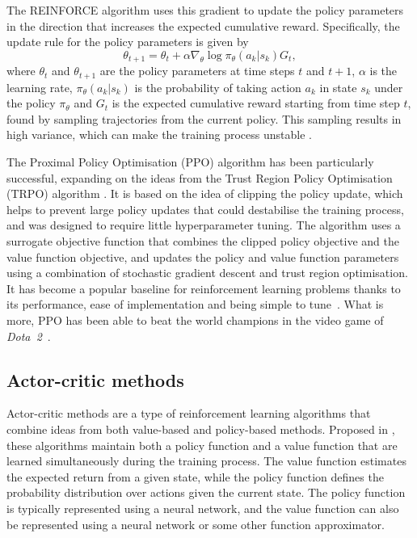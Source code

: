 The REINFORCE algorithm uses this gradient to update the policy parameters in the direction that increases the expected cumulative reward. Specifically, the update rule for the policy parameters is given by
\begin{equation}
    \theta_{t+1} = \theta_t + \alpha \nabla_{\theta} \log \pi_{\theta}(a_k|s_k) G_t,
\end{equation}
where $\theta_t$ and $\theta_{t+1}$ are the policy parameters at time steps $t$ and $t+1$, $\alpha$ is the learning rate, $\pi_{\theta}(a_k|s_k)$ is the probability of taking action $a_k$ in state $s_k$ under the policy $\pi_{\theta}$ and $G_t$ is the expected cumulative reward starting from time step $t$, found by sampling trajectories from the current policy.
This sampling results in high variance, which can make the training process unstable \autocite{arulkumaran2017}.

The Proximal Policy Optimisation (PPO) algorithm \autocite{schulman2017} has been particularly successful, expanding on the ideas from the Trust Region Policy Optimisation (TRPO) algorithm \autocite{schulman2015}.
It is based on the idea of clipping the policy update, which helps to prevent large policy updates that could destabilise the training process, and was designed to require little hyperparameter tuning.
The algorithm uses a surrogate objective function that combines the clipped policy objective and the value function objective, and updates the policy and value function parameters using a combination of stochastic gradient descent and trust region optimisation.
It has become a popular baseline for reinforcement learning problems thanks to its performance, ease of implementation and being simple to tune~\autocite{schulman2017}.
What is more, PPO has been able to beat the world champions in the video game of \textit{Dota~2}~\autocite{brockman2018,openai2019}.

\subsection{Actor-critic methods}
Actor-critic methods are a type of reinforcement learning algorithms that combine ideas from both value-based and policy-based methods.
Proposed in \autocite{konda1999}, these algorithms maintain both a policy function and a value function that are learned simultaneously during the training process.
The value function estimates the expected return from a given state, while the policy function defines the probability distribution over actions given the current state.
The policy function is typically represented using a neural network, and the value function can also be represented using a neural network or some other function approximator.

